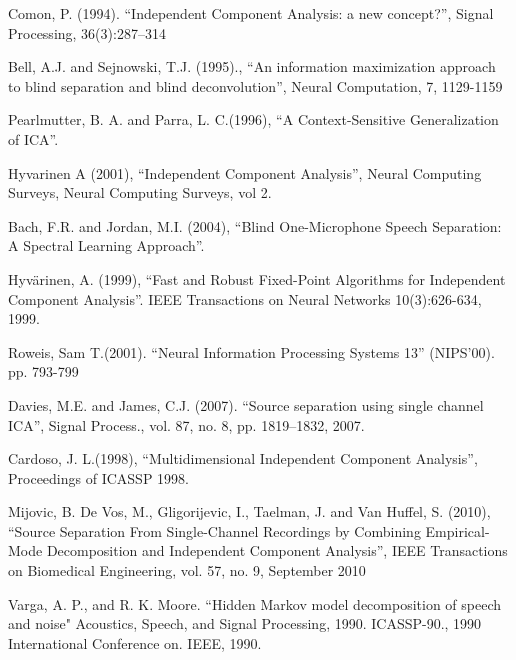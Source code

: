 
\begin{thebibliography}{99}

 Comon, P. (1994). 
``Independent Component Analysis: a new concept?'', 
Signal Processing, 36(3):287–314

 Bell, A.J. and Sejnowski, T.J. (1995).,
``An information maximization approach to blind separation and blind deconvolution'', 
Neural Computation, 7, 1129-1159

Pearlmutter, B. A. and Parra, L. C.(1996),
``A Context-Sensitive Generalization of ICA''. 

Hyvarinen A (2001),
``Independent Component Analysis'',
Neural Computing Surveys, Neural Computing Surveys, vol 2.

 Bach, F.R. and Jordan, M.I. (2004),
``Blind One-Microphone Speech Separation: A Spectral Learning
  Approach''.

Hyvärinen, A. (1999),
``Fast and Robust Fixed-Point Algorithms for Independent Component
  Analysis''. 
IEEE Transactions on Neural Networks 10(3):626-634, 1999.

Roweis, Sam T.(2001).
``Neural Information Processing Systems 13'' (NIPS'00).
pp. 793-799
  
Davies, M.E. and James, C.J. (2007).
``Source separation using single channel ICA'',
Signal Process., vol. 87, no. 8, pp. 1819–1832, 2007.

Cardoso, J. L.(1998),
``Multidimensional Independent Component Analysis'',
Proceedings of ICASSP 1998.

 Mijovic, B. De Vos, M.,  Gligorijevic, I.,
  Taelman, J. and Van Huffel, S. (2010),
``Source Separation From Single-Channel Recordings by Combining
  Empirical-Mode Decomposition and Independent Component Analysis'',
IEEE Transactions on Biomedical Engineering, vol. 57, no. 9, September 2010

Varga, A. P., and R. K. Moore. 
``Hidden Markov model decomposition of speech and noise"
Acoustics, Speech, and Signal Processing, 1990. ICASSP-90., 1990 International Conference on. IEEE, 1990.






\end{thebibliography}





